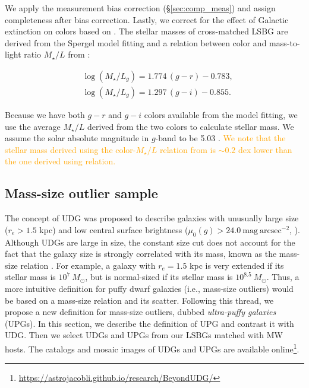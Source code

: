 \documentclass[twocolumn,astrosymb,twocolappendix,linenumbers]{aastex631}
\newcommand{\sbunit}{\mathrm{mag\ arcsec}^{-2}}
\newcommand{\sbcen}{\mu_{0}(g)}
\newcommand{\emphasize}{\textcolor{orange}}
\begin{document}
\begin{CJK*}{UTF8}{gbsn}
We apply the measurement bias correction (\S \ref{sec:comp_meas}) and assign completeness after bias correction. Lastly, we correct for the effect of Galactic extinction on colors based on \citet{SFD1998,Schlafly2011}. The stellar masses of cross-matched LSBG are derived from the Spergel model fitting and a relation between color and mass-to-light ratio $M_{\star}/L$ from \citet{Into2013}:

\begin{align*}
&\log \left(M_{\star} / L_{g}\right)=1.774\,(g-r)-0.783, \\
&\log \left(M_{\star} / L_{g}\right)=1.297\,(g-i)-0.855.
\end{align*}

Because we have both $g-r$ and $g-i$ colors available from the model fitting, we use the average $M_{\star}/L$ derived from the two colors to calculate stellar mass. We assume the solar absolute magnitude in $g$-band to be 5.03 \citep{Willmer2018}. \emphasize{We note that the stellar mass derived using the color-$M_\star/L$ relation from \citet{Herrmann2016,Du2020} is $\sim 0.2$ dex lower than the one derived using \citet{Into2013} relation.}


\subsection{Mass-size outlier sample}\label{sec:sample}
The concept of UDG was proposed to describe galaxies with unusually large size ($r_e>1.5$ kpc) and low central surface brightness ($\sbcen > 24.0\ \sbunit$, \citealt{vanDokkum2015}). Although UDGs are large in size, the constant size cut does not account for the fact that the galaxy size is strongly correlated with its mass, known as the mass-size relation \citep[e.g.,][]{Graham2003,Trujillo2007,vanDokkum2013,Cappellari2013,Lange2015}. For example, a galaxy with $r_e = 1.5$ kpc is very extended if its stellar mass is $10^7\ M_\odot$, but is normal-sized if its stellar mass is $10^{8.5}\ M_\odot$.
Thus, a more intuitive definition for puffy dwarf galaxies (i.e., mass-size outliers) would be based on a mass-size relation and its scatter. Following this thread, we propose a new definition for mass-size outliers, dubbed \textit{ultra-puffy galaxies} (UPGs). In this section, we describe the definition of UPG and contrast it with UDG. Then we select UDGs and UPGs from our LSBGs matched with MW hosts. The catalogs and mosaic images of UDGs and UPGs are available online\footnote{\url{https://astrojacobli.github.io/research/BeyondUDG/}}.


\end{CJK*}
\end{document}
